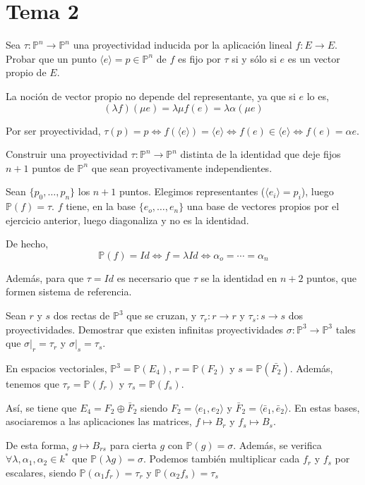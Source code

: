 \section{Tema 2}
\begin{ejer}
    [1] Sea $\tau : \mathbb P^n \to \mathbb P^n$ una proyectividad inducida por la aplicaci\'on lineal $f : E \to E$. Probar que un punto $\langle e \rangle = p \in \mathbb P^n$ de $f$ es fijo por $\tau$ si y s\'olo si $e$ es un vector propio de $E$.
\end{ejer}
\begin{obs}
    La noci\'on de vector propio no depende del representante, ya que si $e$ lo es, 
    $$(\lambda f)(\mu e) = \lambda \mu f(e) = \lambda \alpha (\mu e)$$
\end{obs}
\begin{sol}
Por ser proyectividad, $\tau(p)=p \iff f(\langle e\rangle) = \langle e\rangle \iff f(e) \in \langle e\rangle \iff f(e)=\alpha e$. 
\end{sol}
\begin{ejer}
    [2] Construir una proyectividad $\tau : \mathbb P^n \to \mathbb P^n$  distinta de la identidad que deje fijos $n + 1$ puntos de $\mathbb P^n$ que sean proyectivamente independientes.
\end{ejer}
\begin{sol} Sean $\{p_0, \ldots, p_n\}$ los $n+1$ puntos.
    Elegimos representantes ($\langle e_i \rangle = p_i$), luego $\mathbb P(f) = \tau$. $f$ tiene, en la base $\{e_o, \ldots, e_n\}$ una base de vectores propios por el ejercicio anterior, luego diagonaliza y no es la identidad.

    De hecho, 
    $$\mathbb P(f) = Id \iff f=\lambda Id \iff \alpha_o = \cdots = \alpha_n$$

    Adem\'as, para que $\tau=Id$ es necersario que $\tau$ se la identidad en $n+2$ puntos, que formen sistema de referencia.
\end{sol}
\begin{ejer}
    [6] Sean $r$ y $s$ dos rectas de $\mathbb P^3$ que se cruzan, y 
    $\tau_r : r \to r$ y $\tau_s : s \to s$ dos proyectividades. Demostrar que existen infinitas proyectividades $\sigma : \mathbb P^3 \to \mathbb P^3$ tales que $\sigma|_r = \tau_r$ y $\sigma|_s = \tau_s$.
\end{ejer}
\begin{sol}
    En espacios vectoriales, $\mathbb P^3 = \mathbb P(E_4)$, $r=\mathbb P(F_2)$ y $s = \mathbb P(\bar{F_2})$. Adem\'as, tenemos que $\tau_r = \mathbb P(f_r)$ y $\tau_s = \mathbb P(f_s)$. 

    As\'i, se tiene que $E_4 = F_2 \oplus \bar{F}_2$ siendo $F_2 = \langle e_1,e_2 \rangle$ y $\bar F_2 = \langle \bar e _1, \bar e _2 \rangle$. En estas bases, asociaremos a las aplicaciones las matrices, $f \mapsto B_r$ y $f_s \mapsto B_s$.

    De esta forma, $g \mapsto B_{rs}$ para cierta $g$ con $\mathbb P(g) = \sigma$. Adem\'as, se verifica $\forall \lambda, \alpha_1, \alpha_2 \in k^*$ que $\mathbb P(\lambda g) = \sigma$. Podemos tambi\'en multiplicar cada $f_r$ y $f_s$ por escalares, siendo $\mathbb P(\alpha_1 f_r) = \tau_r$ y $\mathbb P(\alpha_2 f_s) = \tau_s$
\end{sol}
